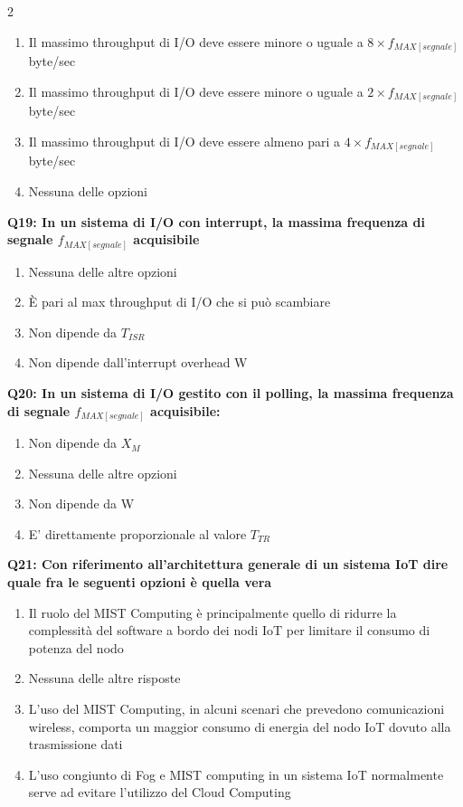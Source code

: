 \documentclass[10pt]{article}
\begin{document}
\begin{multicols}{2}
\begin{enumerate}[label=\arabic*.]
\item Il massimo throughput di I/O deve essere minore o uguale a $8 \times f_{MAX[segnale]}$ byte/sec
\item Il massimo throughput di I/O deve essere minore o uguale a $2 \times f_{MAX[segnale]}$ byte/sec
\item Il massimo throughput di I/O deve essere almeno pari a $4 \times f_{MAX[segnale]}$ byte/sec
\item Nessuna delle opzioni
\end{enumerate}
\textbf{Q19: In un sistema di I/O con interrupt, la massima frequenza di segnale $f_{MAX[segnale]}$ acquisibile}

\begin{enumerate}[label=\arabic*.]
\item Nessuna delle altre opzioni
\item È pari al max throughput di I/O che si può scambiare
\item Non dipende da $T_{ISR}$
\item Non dipende dall’interrupt overhead W
\end{enumerate}
\textbf{Q20: In un sistema di I/O gestito con il polling, la massima frequenza di segnale $f_{MAX[segnale]}$ acquisibile:}

\begin{enumerate}[label=\arabic*.]
\item Non dipende da $X_M$
\item Nessuna delle altre opzioni
\item Non dipende da W
\item E' direttamente proporzionale al valore $T_{TR}$
\end{enumerate}
\textbf{Q21: Con riferimento all’architettura generale di un sistema IoT dire quale fra le seguenti opzioni è quella vera}

\begin{enumerate}[label=\arabic*.]
\item Il ruolo del MIST Computing è principalmente quello di ridurre la complessità del software a bordo dei nodi IoT per limitare il consumo di potenza del nodo
\item Nessuna delle altre risposte
\item L’uso del MIST Computing, in alcuni scenari che prevedono comunicazioni wireless, comporta un maggior consumo di energia del nodo IoT dovuto alla trasmissione dati
\item L’uso congiunto di Fog e MIST computing in un sistema IoT normalmente serve ad evitare l’utilizzo del Cloud Computing
\end{enumerate}
\end{multicols}
\end{document}

